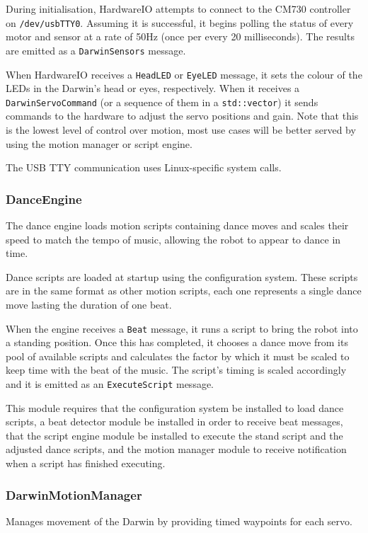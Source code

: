 \documentclass[english,12pt]{scrartcl}
\begin{document}
				During initialisation, HardwareIO attempts to connect to the CM730 controller on
				\texttt{/dev/usbTTY0}. Assuming it is successful, it begins polling the status of
				every motor and sensor at a rate of 50Hz (once per every 20 milliseconds). The
				results are emitted as a \texttt{DarwinSensors} message.

				When HardwareIO receives a \texttt{HeadLED} or \texttt{EyeLED} message, it sets
				the colour of the LEDs in the Darwin's head or eyes, respectively.
				When it receives a \texttt{DarwinServoCommand} (or a sequence of them in a
				\texttt{std::vector}) it sends commands to the hardware to adjust the servo
				positions and gain. Note that this is the lowest level of control over motion,
				most use cases will be better served by using the motion manager or script engine.

				The USB TTY communication uses Linux-specific system calls.

			\subsubsection{DanceEngine}
				The dance engine loads motion scripts containing dance moves and scales their
				speed to match the tempo of music, allowing the robot to appear to dance in time.

				Dance scripts are loaded at startup using the configuration system. These scripts
				are in the same format as other motion scripts, each one represents a single dance
				move lasting the duration of one beat.

				When the engine receives a \texttt{Beat} message, it runs a script to bring the
				robot into a standing position. Once this has completed, it chooses a dance move
				from its pool of available scripts and calculates the factor by which it must be
				scaled to keep time with the beat of the music. The script's timing is scaled
				accordingly and it is emitted as an \texttt{ExecuteScript} message.

				This module requires that the configuration system be installed to load dance
				scripts, a beat detector module be installed in order to receive beat messages,
				that the script engine module be installed to execute the stand script and the
				adjusted dance scripts, and the motion manager module to receive notification
				when a script has finished executing.


			\subsubsection{DarwinMotionManager}
				Manages movement of the Darwin by providing timed waypoints for each servo.
\end{document}
